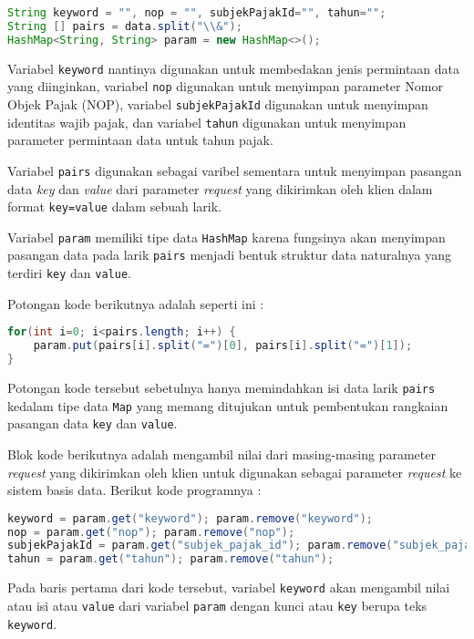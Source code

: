 \documentclass[pdftex,12pt, oneside]{article}
\begin{document}
\begin{lstlisting}[language=java]
String keyword = "", nop = "", subjekPajakId="", tahun="";
String [] pairs = data.split("\\&");
HashMap<String, String> param = new HashMap<>();
\end{lstlisting}

Variabel \texttt{keyword} nantinya digunakan untuk membedakan jenis permintaan data yang diinginkan, variabel \texttt{nop} digunakan untuk menyimpan parameter Nomor Objek Pajak (NOP), variabel \texttt{subjekPajakId} digunakan untuk menyimpan identitas wajib pajak, dan variabel \texttt{tahun} digunakan untuk menyimpan parameter permintaan data untuk tahun pajak.

Variabel \texttt{pairs} digunakan sebagai varibel sementara untuk menyimpan pasangan data \textit{key} dan \textit{value} dari parameter \textit{request} yang dikirimkan oleh klien dalam format \texttt{key=value} dalam sebuah larik.

Variabel \texttt{param} memiliki tipe data \texttt{HashMap} karena fungsinya akan menyimpan pasangan data pada larik \texttt{pairs} menjadi bentuk struktur data naturalnya yang terdiri \texttt{key} dan \texttt{value}.

Potongan kode berikutnya adalah seperti ini :

\begin{lstlisting}[language=java]
for(int i=0; i<pairs.length; i++) {
	param.put(pairs[i].split("=")[0], pairs[i].split("=")[1]);
}
\end{lstlisting}

Potongan kode tersebut sebetulnya hanya memindahkan isi data larik \texttt{pairs} kedalam tipe data \texttt{Map} yang memang ditujukan untuk pembentukan rangkaian pasangan data \texttt{key} dan \texttt{value}.

Blok kode berikutnya adalah mengambil nilai dari masing-masing parameter \textit{request} yang dikirimkan oleh klien untuk digunakan sebagai parameter \textit{request} ke sistem basis data. Berikut kode programnya :

\begin{lstlisting}[language=java]
keyword = param.get("keyword"); param.remove("keyword");
nop = param.get("nop"); param.remove("nop");
subjekPajakId = param.get("subjek_pajak_id"); param.remove("subjek_pajak_id");
tahun = param.get("tahun"); param.remove("tahun");
\end{lstlisting}

Pada baris pertama dari kode tersebut, variabel \texttt{keyword} akan mengambil nilai atau isi atau \texttt{value} dari variabel \texttt{param} dengan kunci atau \texttt{key} berupa teks \texttt{keyword}.
\end{document}
